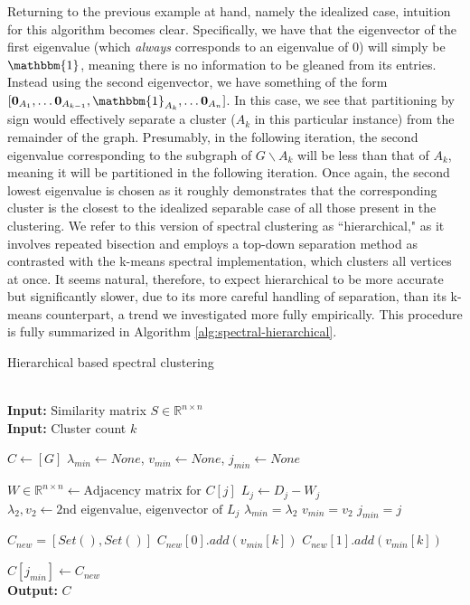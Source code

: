 \documentclass{article}
\begin{document}
Returning to the previous example at hand, namely the idealized case, intuition for this algorithm becomes clear. Specifically, we have that the eigenvector of the first eigenvalue (which \textit{always} corresponds to an eigenvalue of 0) will simply be $\mathbbm{1}$, meaning there is no information to be gleaned from its entries. Instead using the second eigenvector, we have something of the form $[\textbf{0}_{A_1},\dots\textbf{0}_{A_{k-1}},\mathbbm{1}_{A_k},\dots\textbf{0}_{A_n}]$. In this case, we see that partitioning by sign would effectively separate a cluster ($A_k$ in this particular instance) from the remainder of the graph. Presumably, in the following iteration, the second eigenvalue corresponding to the subgraph of $G\backslash A_k$ will be less than that of $A_k$, meaning it will be partitioned in the following iteration. Once again, the second lowest eigenvalue is chosen as it roughly demonstrates that the corresponding cluster is the closest to the idealized separable case of all those present in the clustering. We refer to this version of spectral clustering as ``hierarchical," as it involves repeated bisection and employs a top-down separation method as contrasted with the k-means spectral implementation, which clusters all vertices at once. It seems natural, therefore, to expect hierarchical to be more accurate but significantly slower, due to its more careful handling of separation, than its k-means counterpart, a trend we investigated more fully empirically. This procedure is fully summarized in Algorithm \ref{alg:spectral-hierarchical}. 

\begin{algorithm}
\caption{Hierarchical based spectral clustering \cite{spectral}}\label{alg:spectral-hierarchical}
\begin{algorithmic}[1]
 \\
\textbf{Input:} Similarity matrix $S\in\mathbb{R}^{n\times n}$ \\
\textbf{Input:} Cluster count $k$

\State $C \gets [G]$
    \State $\lambda_{min} \gets None$, $v_{min} \gets None$, $j_{min} \gets None$
    
        \State $W\in\mathbb{R}^{n\times n} \gets \text{Adjacency matrix for } C[j]$
        \State $L_j \gets D_j - W_j$
        \State $\lambda_2,v_2\gets\text{2nd eigenvalue, eigenvector of } L_j$
            \State $\lambda_{min} = \lambda_2$
            \State $v_{min} = v_2$
            \State $j_{min} = j$
        \EndIf
    \EndFor
    
    \State $C_{new} = [Set(),Set()]$
                $C_{new}[0].add(v_{min}[k])$
            \Else 
                $C_{new}[1].add(v_{min}[k])$
            \EndIf
        \EndFor
        
    \State $C[j_{min}] \gets C_{new}$
\EndFor \\

\textbf{Output:} $C$
\EndProcedure
\end{algorithmic}
\end{algorithm}
\end{document}
